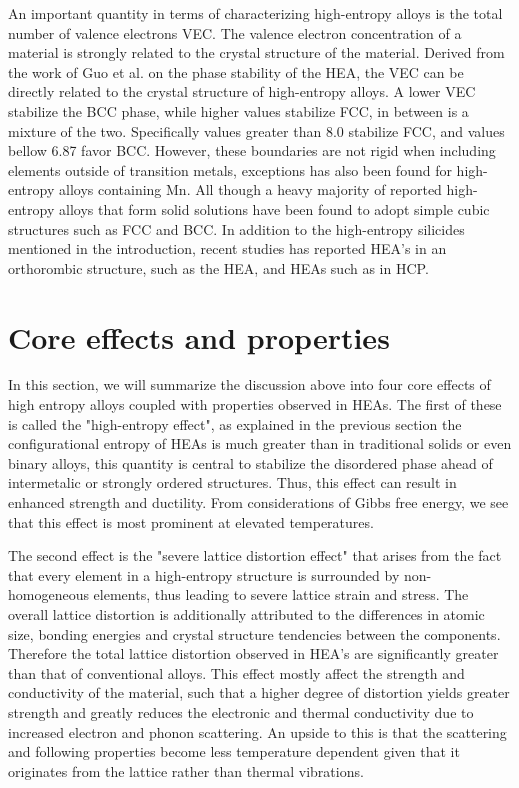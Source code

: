 An important quantity in terms of characterizing high-entropy alloys is the total number of valence electrons VEC. The valence electron concentration of a material is strongly related to the crystal structure of the material. Derived from the work of Guo et al. on the phase stability of the  HEA, the VEC can be directly related to the crystal structure of high-entropy alloys. A lower VEC stabilize the BCC phase, while higher values stabilize FCC, in between is a mixture of the two. Specifically values greater than 8.0 stabilize FCC, and values bellow 6.87 favor BCC. However, these boundaries are not rigid when including elements outside of transition metals, exceptions has also been found for high-entropy alloys containing Mn. All though a heavy majority of reported high-entropy alloys that form solid solutions have been found to adopt simple cubic structures such as FCC and BCC. In addition to the high-entropy silicides mentioned in the introduction, recent studies has reported HEA's in an orthorombic structure, such as the  HEA, and HEAs such as  in HCP.

\section{Core effects and properties}
In this section, we will summarize the discussion above into four core effects of high entropy alloys coupled with properties observed in HEAs. The first of these is called the "high-entropy effect", as explained in the previous section the configurational entropy of HEAs is much greater than in traditional solids or even binary alloys, this quantity is central to stabilize the disordered phase ahead of intermetalic or strongly ordered structures. Thus, this effect can result in enhanced strength and ductility. From considerations of Gibbs free energy, we see that this effect is most prominent at elevated temperatures.

The second effect is the "severe lattice distortion effect" that arises from the fact that every element in a high-entropy structure is surrounded by non-homogeneous elements, thus leading to severe lattice strain and stress. The overall lattice distortion is additionally attributed to the differences in atomic size, bonding energies and crystal structure tendencies between the components. Therefore the total lattice distortion observed in HEA's are significantly greater than that of conventional alloys. This effect mostly affect the strength and conductivity of the material, such that a higher degree of distortion yields greater strength and greatly reduces the electronic and thermal conductivity due to increased electron and phonon scattering. An upside to this is that the scattering and following properties become less temperature dependent given that it originates from the lattice rather than thermal vibrations.

